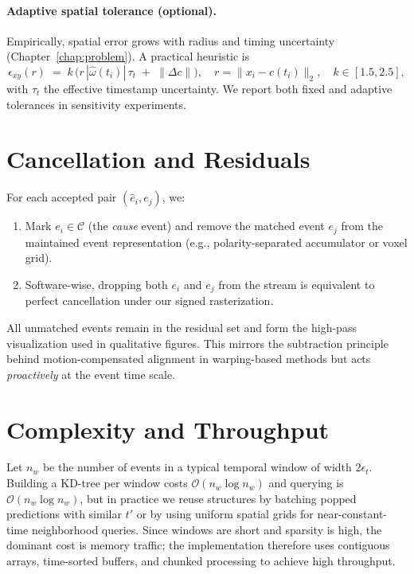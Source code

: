 \paragraph{Adaptive spatial tolerance (optional).}
Empirically, spatial error grows with radius and timing uncertainty (Chapter~\ref{chap:problem}). A practical heuristic is
\begin{equation}
\epsilon_{xy}(r) \;=\; k \,\big(r\,|\hat\omega(t_i)|\,\tau_t \;+\; \|\Delta c\|\big),
\quad r=\|x_i-\hat c(t_i)\|_2, \quad k\in[1.5,2.5],
\label{eq:adaptive-eps}
\end{equation}
with $\tau_t$ the effective timestamp uncertainty. We report both fixed and adaptive tolerances in sensitivity experiments.

\section{Cancellation and Residuals}
For each accepted pair $(\hat e_i,e_j)$, we:
\begin{enumerate}
    \item Mark $e_i \in \mathcal{C}$ (the \emph{cause} event) and remove the matched event $e_j$ from the maintained event representation (e.g., polarity-separated accumulator or voxel grid).
    \item Software-wise, dropping both $e_i$ and $e_j$ from the stream is equivalent to perfect cancellation under our signed rasterization.
\end{enumerate}
All unmatched events remain in the residual set and form the high-pass visualization used in qualitative figures. This mirrors the subtraction principle behind motion-compensated alignment in warping-based methods \cite{Gallego2018CMax,Stoffregen2019Segmentation} but acts \emph{proactively} at the event time scale.

\section{Complexity and Throughput}
Let $n_w$ be the number of events in a typical temporal window of width $2\epsilon_t$. Building a KD-tree per window costs $\mathcal{O}(n_w\log n_w)$ and querying is $\mathcal{O}(n_w\log n_w)$, but in practice we reuse structures by batching popped predictions with similar $t'$ or by using uniform spatial grids for near-constant-time neighborhood queries. Since windows are short and sparsity is high, the dominant cost is memory traffic; the implementation therefore uses contiguous arrays, time-sorted buffers, and chunked processing to achieve high throughput.

